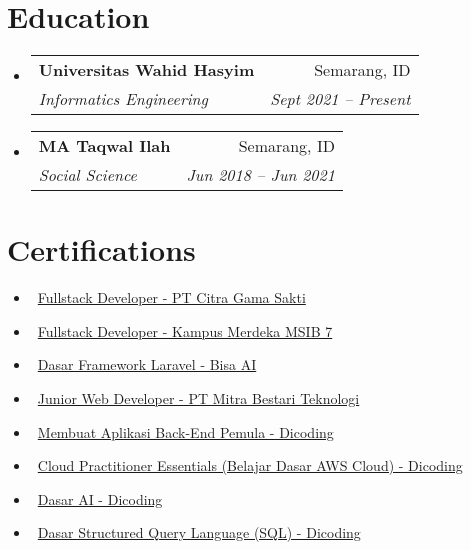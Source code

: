 \documentclass[letterpaper,10pt]{article}
\makeatletter
\newcommand{\resumeItem}[1]{\item\small{#1}}
\newcommand{\resumeSubheading}[4]{
\vspace{-1pt}\item
  \begin{tabular*}{0.97\textwidth}[t]{l@{\extracolsep{\fill}}r}
    \textbf{#1} & #2 \\
    \textit{#3} & \textit{#4} \\
  \end{tabular*}\vspace{-7pt}
}
\newcommand{\resumeSubHeadingList}{\begin{itemize}[leftmargin=0.15in, label={}]}
\newcommand{\resumeSubHeadingListEnd}{\end{itemize}}
\makeatother
\begin{document}

\section{Education}
\resumeSubHeadingList
  \resumeSubheading
      {Universitas Wahid Hasyim}{Semarang, ID}
      {Informatics Engineering}{Sept 2021 -- Present}
  \resumeSubheading
      {MA Taqwal Ilah}{Semarang, ID}
      {Social Science}{Jun 2018 -- Jun 2021}
\resumeSubHeadingListEnd

\section{Certifications}
\resumeSubHeadingList
  \resumeItem{\textbullet\ \href{https://drive.google.com/file/d/1I5-TYqm2pZG1axxwgvooE3N1Yt7ndzix/view?usp=sharing}{Fullstack Developer - PT Citra Gama Sakti}}
  \resumeItem{\textbullet\ \href{https://drive.google.com/file/d/1gXP7IY-nlXnFLyBVYMxH2hvolo24P5uf/view?usp=sharing}{Fullstack Developer - Kampus Merdeka MSIB 7}}
  \resumeItem{\textbullet\ \href{https://drive.google.com/file/d/1w7MXQxv3cCrubTDo4msD4kQ5zSHkZ2Nk/view?usp=sharing}{Dasar Framework Laravel - Bisa AI}}
  \resumeItem{\textbullet\ \href{https://drive.google.com/file/d/1ofTP_1304GDRNLfoTA9biHpumaGSnjNE/view?usp=sharing}{Junior Web Developer - PT Mitra Bestari Teknologi}}
  \resumeItem{\textbullet\ \href{https://www.dicoding.com/certificates/RVZKR0L1QPD5}{Membuat Aplikasi Back-End Pemula - Dicoding}}
  \resumeItem{\textbullet\ \href{https://www.dicoding.com/certificates/72ZDVK636ZYW}{Cloud Practitioner Essentials (Belajar Dasar AWS Cloud) - Dicoding}}
  \resumeItem{\textbullet\ \href{https://www.dicoding.com/certificates/1OP8W4QK1XQK}{Dasar AI - Dicoding}}
  \resumeItem{\textbullet\ \href{https://www.dicoding.com/certificates/RVZKREDYMPD5}{Dasar Structured Query Language (SQL) - Dicoding}}
\resumeSubHeadingListEnd
\end{document}

